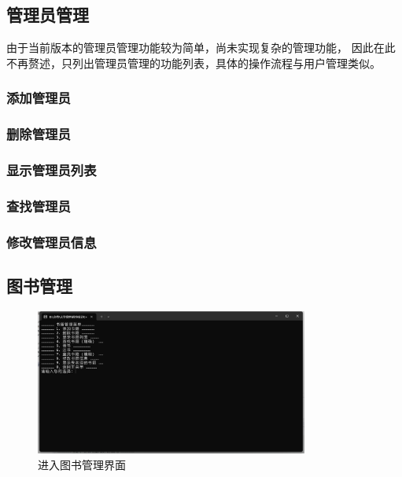 \documentclass[12pt,twoside]{ctexart}
\begin{document}
\newpage
\subsection{管理员管理}

由于当前版本的管理员管理功能较为简单，尚未实现复杂的管理功能，
因此在此不再赘述，只列出管理员管理的功能列表，具体的操作流程与用户管理类似。

\subsubsection{添加管理员}

\subsubsection{删除管理员}

\subsubsection{显示管理员列表}

\subsubsection{查找管理员}

\subsubsection{修改管理员信息}

\newpage
\subsection{图书管理}

\begin{figure}[H]
    \centering
    \includegraphics[width=0.8\textwidth]{Book/Bookmenu.png}
    \caption{进入图书管理界面}
\end{figure}
\end{document}
